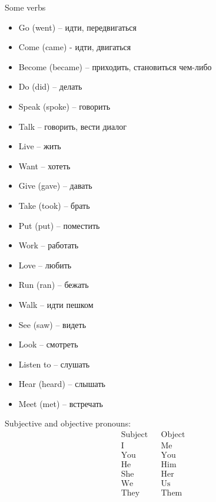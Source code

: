 \documentclass{tstextbook}
\begin{document}
	\newpage
	
	\begin{example}Some verbs
		\label{def:some_verbs}
		\begin{itemize}
			\item Go (went) -- идти, передвигаться
			\item Come (came) - идти, двигаться
			\item Become (became) -- приходить, становиться чем-либо
			\item Do (did) -- делать
			\item Speak (spoke) -- говорить
			\item Talk -- говорить, вести диалог	
			\item Live -- жить
			\item Want -- хотеть
			\item Give (gave) -- давать
			\item Take (took) -- брать
			\item Put (put) -- поместить
			\item Work -- работать
			\item Love -- любить
			\item Run (ran) -- бежать
			\item Walk -- идти пешком
			\item See (saw) -- видеть
			\item Look -- смотреть
			\item Listen to -- слушать
			\item Hear (heard) -- слышать
			\item Meet (met) -- встречать
		\end{itemize}
	\end{example}

\begin{theorem}
	\label{th: pronouns2}
	Subjective and objective pronouns:
	\begin{align*}
		\text{Subject} && \text{Object}  \\
		\hline
		\text{I} && \text{Me} \\
		\text{You} && \text{You}\\
		\text{He} && \text{Him}\\
		\text{She} && \text{Her} \\
		\text{We} && \text{Us} \\
		\text{They} && \text{Them}
	\end{align*}
\end{theorem}
\end{document}
